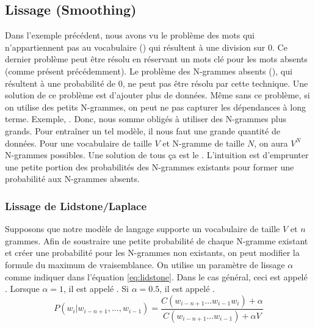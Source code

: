 \documentclass{KodeBook}
\begin{document}
\subsection{Lissage (Smoothing)}

Dans l'exemple précédent, nous avons vu le problème des mots qui n'appartiennent pas au vocabulaire () qui résultent à une division sur $0$. 
Ce dernier problème peut être résolu en réservant un mots clé pour les mots absents (comme présent précédemment).
Le problème des N-grammes absents (), qui résultent à une probabilité de $0$, ne peut pas être résolu par cette technique. 
Une solution de ce problème est d'ajouter plus de données.
Même sans ce problème, si on utilise des petits N-grammes, on peut ne pas capturer les dépendances à long terme. 
Exemple, . 
Donc, nous somme obligés à utiliser des N-grammes plus grands. 
Pour entraîner un tel modèle, il nous faut une grande quantité de données. 
Pour une vocabulaire de taille $V$ et N-gramme de taille $N$, on aura $V^N$ N-grammes possibles.
Une solution de tous ça est le .
L'intuition est d'emprunter une petite portion des probabilités des N-grammes existants pour former une probabilité aux N-grammes absents.

\subsubsection{Lissage de Lidstone/Laplace}

Supposons que notre modèle de langage supporte un vocabulaire de taille $V$ et $n$ grammes.
Afin de soustraire une petite probabilité de chaque N-gramme existant et créer une probabilité pour les N-grammes non existants, on peut modifier la formule du maximum de vraisemblance.
On utilise un paramètre de lissage $\alpha$ comme indiquer dans l'équation \ref{eq:lidstone}.
Dans le cas général, ceci est appelé . 
Lorsque $\alpha = 1$, il est appelé . 
Si $\alpha = 0.5$, il est appelé .
\begin{equation}
	P(w_i | w_{i-n+1}, \ldots, w_{i-1}) = \frac{C(w_{i-n+1} \ldots w_{i-1} w_i) + \alpha}{C(w_{i-n+1} \ldots w_{i-1}) + \alpha V}
	\label{eq:lidstone}
\end{equation}
\end{document}
